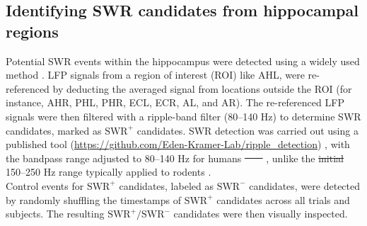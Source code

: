 \documentclass[preprint,review,12pt]{elsarticle}%
\providecommand{\DIFaddtex}[1]{{\protect\color{blue}\uwave{#1}}} %
\providecommand{\DIFdeltex}[1]{{\protect\color{red}\sout{#1}}}                      %
\providecommand{\DIFaddbegin}{} %
\providecommand{\DIFaddend}{} %
\providecommand{\DIFdelbegin}{} %
\providecommand{\DIFdelend}{} %
\providecommand{\DIFadd}[1]{\texorpdfstring{\DIFaddtex{#1}}{#1}} %
\providecommand{\DIFdel}[1]{\texorpdfstring{\DIFdeltex{#1}}{}} %
\newcommand{\DIFscaledelfig}{0.5}
\newlength{\DIFdelgraphicswidth} %
\newlength{\DIFdelgraphicsheight} %
\newcommand{\DIFaddincludegraphics}[2][]{{\color{blue}\fbox{\DIFOincludegraphics[#1]{#2}}}} %
\newcommand{\DIFdelincludegraphics}[2][]{%
\sbox{\DIFdelgraphicsbox}{\DIFOincludegraphics[#1]{#2}}%
\settoboxwidth{\DIFdelgraphicswidth}{\DIFdelgraphicsbox} %
\settoboxtotalheight{\DIFdelgraphicsheight}{\DIFdelgraphicsbox} %
\scalebox{\DIFscaledelfig}{%
\parbox[b]{\DIFdelgraphicswidth}{\usebox{\DIFdelgraphicsbox}\\[-\baselineskip] \rule{\DIFdelgraphicswidth}{0em}}\llap{\resizebox{\DIFdelgraphicswidth}{\DIFdelgraphicsheight}{%
\setlength{\unitlength}{\DIFdelgraphicswidth}%
\begin{picture}(1,1)%
\thicklines\linethickness{2pt} %
{\color[rgb]{1,0,0}\put(0,0){\framebox(1,1){}}}%
{\color[rgb]{1,0,0}\put(0,0){\line( 1,1){1}}}%
{\color[rgb]{1,0,0}\put(0,1){\line(1,-1){1}}}%
\end{picture}%
}\hspace*{3pt}}} %
} %
\DeclareRobustCommand{\DIFaddbegin}{\DIFOaddbegin \let\includegraphics\DIFaddincludegraphics} %
\DeclareRobustCommand{\DIFaddend}{\DIFOaddend \let\includegraphics\DIFOincludegraphics} %
\DeclareRobustCommand{\DIFdelbegin}{\DIFOdelbegin \let\includegraphics\DIFdelincludegraphics} %
\DeclareRobustCommand{\DIFdelend}{\DIFOaddend \let\includegraphics\DIFOincludegraphics} %
\begin{document}
\indent
\DIFaddend \subsection{Identifying SWR candidates from hippocampal regions}
Potential SWR events within the hippocampus were detected using a widely used method \cite{liu_consensus_2022}. LFP signals from a region of interest (ROI) like AHL, were re-referenced by deducting the averaged signal from locations outside the ROI (for instance, AHR, PHL, PHR, ECL, ECR, AL, and AR). The re-referenced LFP signals were then filtered with a ripple-band filter (80--140 Hz) to determine SWR candidates, marked as $\textrm{SWR}^+$ candidates. SWR detection was carried out using a published tool (\url{https://github.com/Eden-Kramer-Lab/ripple_detection}) \cite{kay_hippocampal_2016}, with the bandpass range adjusted to 80--140 Hz for humans \DIFdelbegin \DIFdel{\mbox{%
\cite{norman_hippocampal_2019} }\hspace{0pt}%
\mbox{%
\cite{norman_hippocampal_2021}}\hspace{0pt}%
}\DIFdelend \DIFaddbegin \DIFadd{\mbox{%
\cite{norman_hippocampal_2019, norman_hippocampal_2021, liu_consensus_2022}}\hspace{0pt}%
}\DIFaddend , unlike the \DIFdelbegin \DIFdel{initial }\DIFdelend \DIFaddbegin \DIFadd{original }\DIFaddend 150--250 Hz range typically applied to rodents \DIFaddbegin \DIFadd{\mbox{%
\cite{foster_reverse_2006, karlsson_awake_2009, carr_hippocampal_2011, pfeiffer_hippocampal_2013, jadhav_awake_2012, singer_hippocampal_2013, buzsaki_hippocampal_2015, wu_hippocampal_2017, fernandez-ruiz_long-duration_2019}}\hspace{0pt}%
}\DIFaddend .
\\
\indent
Control events for $\textrm{SWR}^+$ candidates, labeled as $\textrm{SWR}^-$ candidates, were detected by randomly shuffling the timestamps of $\textrm{SWR}^+$ candidates across all trials and subjects. The resulting $\textrm{SWR}^+/\textrm{SWR}^-$ candidates were then visually inspected.
\DIFdelbegin %
\end{document}
